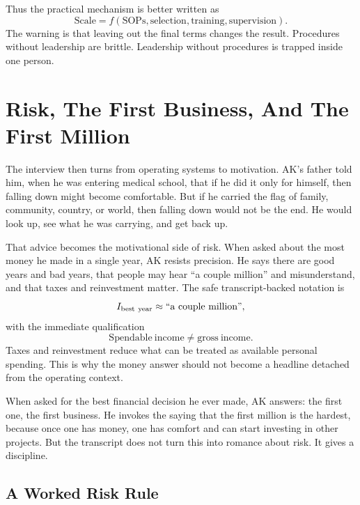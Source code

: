 Thus the practical mechanism is better written as
\begin{equation}
\mathrm{Scale}
=
f(\mathrm{SOPs},\mathrm{selection},\mathrm{training},\mathrm{supervision}).
\end{equation}
The warning is that leaving out the final terms changes the result. Procedures without leadership are brittle. Leadership without procedures is trapped inside one person.

\section{Risk, The First Business, And The First Million}

The interview then turns from operating systems to motivation. AK's father told him, when he was entering medical school, that if he did it only for himself, then falling down might become comfortable. But if he carried the flag of family, community, country, or world, then falling down would not be the end. He would look up, see what he was carrying, and get back up.

That advice becomes the motivational side of risk. When asked about the most money he made in a single year, AK resists precision. He says there are good years and bad years, that people may hear ``a couple million'' and misunderstand, and that taxes and reinvestment matter. The safe transcript-backed notation is
\begin{equation}
I_{\mathrm{best\ year}} \approx \hbox{``a couple million''},
\end{equation}
with the immediate qualification
\begin{equation}
\mathrm{Spendable\ income} \neq \mathrm{gross\ income}.
\end{equation}
Taxes and reinvestment reduce what can be treated as available personal spending. This is why the money answer should not become a headline detached from the operating context.

When asked for the best financial decision he ever made, AK answers: the first one, the first business. He invokes the saying that the first million is the hardest, because once one has money, one has comfort and can start investing in other projects. But the transcript does not turn this into romance about risk. It gives a discipline.

\subsection{A Worked Risk Rule}

